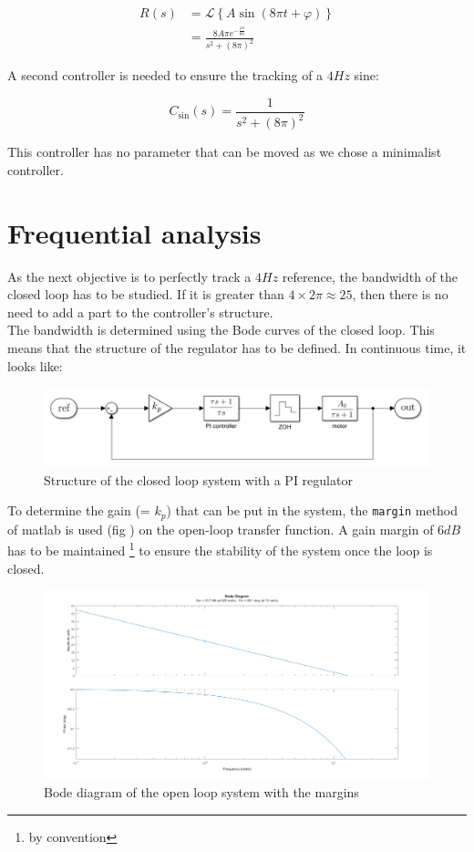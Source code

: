 \begin{align}
    R(s) &= \mathcal{L}\left\{A \sin (8 \pi t + \varphi)\right\} \\
    &= \frac{8 A \pi e^{-\frac{\varphi s}{8 \pi}}}{s^2 + (8\pi)^2}
\end{align}

A second controller is needed to ensure the tracking of a $4 Hz$ sine:

\begin{equation}
    C_{\sin}(s) = \frac{1}{s^2 + (8\pi)^2}
    \label{eq:controller_sin}
\end{equation}

This controller has no parameter that can be moved as we chose a minimalist controller. 
\fi

\section{Frequential analysis}

As the next objective is to perfectly track a $4 Hz$ reference, the bandwidth of the closed loop has to be studied. If
it is greater than $4 \times 2\pi \approx 25$, then there is no need to add a part to the controller's structure.\\
The bandwidth is determined using the Bode curves of the closed loop. This means that the structure of the regulator
has to be defined. In continuous time, it looks like:

\begin{figure}[H]
    \centering
    \includegraphics[height=\textheight/7]{Pictures/controller_structure.png}
    \caption{Structure of the closed loop system with a PI regulator}
    \label{fig:CL structure}
\end{figure}

To determine the gain (= $k_p$) that can be put in the system, the \texttt{margin} method of matlab is used (fig ) on the 
open-loop transfer function. A gain margin of $6 dB$ has to be maintained \footnote{by convention} to ensure the 
stability of the system once the loop is closed. \\

\begin{figure}[H]
    \centering
    \includegraphics[height=\textheight/3]{Pictures/bode_OL.png}
    \caption{Bode diagram of the open loop system with the margins}
    \label{fig:OL bode}
\end{figure}

